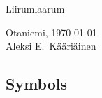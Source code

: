 \documentclass[english, 12pt, a4paper, sci, utf8, a-2b, online]{../definitions/aaltothesis}
\date{\today}
\begin{document}
\makecoverpage

\makecopyrightpage

\clearpage

\begin{abstractpage}[english]
    \abstracttext{}
\end{abstractpage}



\dothesispagenumbering{}

Liirumlaarum

\vspace*{\fill}
Otaniemi, \today \\

\vspace{5mm}
{\hfill Aleksi E.\ Kääriäinen \hspace{1cm}}

\newpage


\thesistableofcontents



\subsection*{Symbols}
\end{document}
